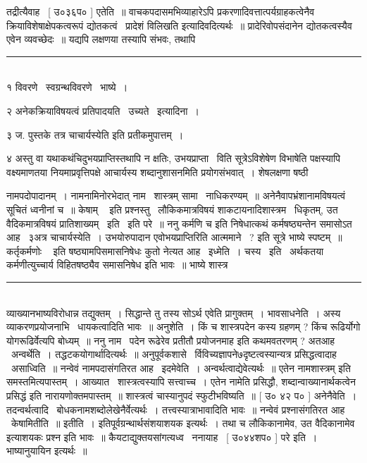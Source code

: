 \documentclass[11pt, openany]{book}
\begin{document}
\begin{multicols}{2}
तद्रीत्यैवाह \textendash\ [ उ०३६प० ] एतेति~॥ वाचकपदासमभिव्याहारेऽपि प्रकरणादिवत्तात्पर्यग्राहकत्वेनैव क्रियाविशेषाक्षेपकत्वरूपं द्योतकत्वं \textendash\ {\qt प्रादेशं विलिखति} इत्यादिवदित्यर्थः~॥ प्रादेरिवोपसंदानेन द्योतकत्वस्यैव एवेन व्यवच्छेदः~॥ यद्यपि लक्षणया तस्यापि संभवः, तथापि

\noindent
\rule{1\linewidth}{0.5pt}\\

१ विवरणे \textendash\ स्वग्रन्थविवरणे \textendash\ भाष्ये~। 

२ अनेकक्रियाविषयत्वं प्रतिपादयति \textendash\ उच्यते \textendash\ इत्यादिना~। 

३ ज. पुस्तके {\qt तत्र चाचार्यस्येति} इति प्रतीकमुपात्तम्~। 

४ अस्तु वा यथाकथंचिदुभयप्राप्तिस्तथापि न क्षतिः, उभयप्राप्ता \textendash\ विति सूत्रेऽविशेषेण विभाषेति पक्षस्यापि वक्ष्यमाणतया नियमाप्रवृत्तिपक्षे आचार्यस्य शब्दानुशासनमिति प्रयोगसंभवात्~। शेषलक्षणा षष्ठी

\columnbreak

\noindent
नामपदोपादानम्~। नामनामिनोरभेदात् {\qt नाम \textendash\ शास्त्रम्} सामा \textendash\ नाधिकरण्यम्~॥ अनेनैवापभ्रंशानामविषयत्वं सूचितं ध्वनीनां च~॥ {\qt केषाम् \textendash\ } इति प्रश्नस्तु \textendash\ लौकिकमात्रविषयं शाकटायनादिशास्त्रम \textendash\ धिकृतम्, उत वैदिकमात्रविषयं प्रातिशाख्यम् \textendash\ इति \textendash\ इति परे~॥ ननु {\qt कर्मणि च} इति निषेधात्कथं कर्मषष्ठ्यन्तेन समासोऽत आह \textendash\ ३अत्र चाचार्यस्येति~। उभयोरुपादान एवोभयप्राप्तिरिति आत्ममाने \textendash\ ? इति सूत्रे भाष्ये स्पष्टम्~॥ {\qt कर्तृकर्मणोः \textendash\ } इति षष्ठ्यामपिसमासनिषेधः कुतो नेत्यत आह \textendash\ इध्मेति~। चस्य \textendash\ इति \textendash\ अर्थकतया कर्मणीत्युच्चार्य विहितषष्ठ्यैव समासनिषेध इति भावः~॥ भाष्ये शास्त्र \textendash\

\noindent
\rule{1\linewidth}{0.5pt}\\

\noindent
व्याख्यानभाष्यविरोधान्न तद्युक्तम्~। सिद्धान्ते तु तस्य सोऽर्थ एवेति प्रागुक्तम्~। भावसाधनेति~। अस्य व्याकरणप्रयोजनाभि \textendash\ धायकत्वादिति भावः~॥ अनुशेति~। किं च शास्त्रपदेन कस्य ग्रहणम् ? किंच रूढिर्योगो योगरूढिर्वेत्यपि बोध्यम्~॥ ननु नाम \textendash\ पदेन रूढेरेव प्रतीतौ {\qt प्रयोजनमाह} इति कथमवतरणम् ? अतआह \textendash\ अन्वर्थेति~। तद्धटकयोगार्थादित्यर्थः~॥ अनुपूर्वकशासे \textendash\ र्विविच्यज्ञापने७दृष्टत्वस्यान्यत्र प्रसिद्धत्वादाह \textendash\ असाध्विति~॥ नन्वेवं नामपदासंगतिरत आह \textendash\ इदमेवेति~। अन्वर्थत्वाद्येवेत्यर्थः~॥ एतेन {\qt नामशास्त्रम् इति समस्तमित्यपास्तम्~। आख्यात \textendash\ शास्त्रत्वस्यापि सत्त्वाच्च~। एतेन नामेति प्रसिद्धौ, शब्दान्वाख्यानार्थकत्वेन प्रसिद्धं} इति नारायणोक्तमपास्तम्~॥ शास्त्रत्वं चास्यानुपदं स्फुटीभविष्यति~॥ [ उ० ४२ प० ] अनेनैवेति~। तदन्वर्थत्वादि \textendash\ बोधकनामशब्दोलेखेनैर्वेत्यर्थः~। तत्त्वस्यात्राभावादिति भावः~॥ नन्वेवं प्रश्नासंगतिरत आह \textendash\ केषामितीति~॥ इतीति~। इतिपूर्वग्रन्थार्थसंशयाशयक इत्यर्थः~। तथा च {\qt लौकिकानामेव, उत वैदिकानामेव} इत्याशयकः प्रश्न इति भावः~॥ कैयटाद्युक्तयसांगत्यध्व \textendash\ ननायाह \textendash\ [ उ०४४शप० ] परे इति~। भाष्यानुयायिन इत्यर्थः~॥\\


\end{multicols}
\end{document}
